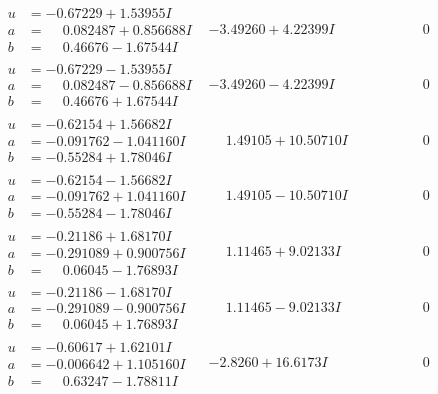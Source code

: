 \documentclass[1p]{elsarticle_modified}
\theoremstyle{definition}
\begin{document}
$$\begin{array}{c|c|c}
\begin{aligned}
u &= -0.67229 + 1.53955 I \\
a &= \phantom{-}0.082487 + 0.856688 I \\
b &= \phantom{-}0.46676 - 1.67544 I\end{aligned}
 & -3.49260 + 4.22399 I & \phantom{-0.000000 } 0 \\ \hline\begin{aligned}
u &= -0.67229 - 1.53955 I \\
a &= \phantom{-}0.082487 - 0.856688 I \\
b &= \phantom{-}0.46676 + 1.67544 I\end{aligned}
 & -3.49260 - 4.22399 I & \phantom{-0.000000 } 0 \\ \hline\begin{aligned}
u &= -0.62154 + 1.56682 I \\
a &= -0.091762 - 1.041160 I \\
b &= -0.55284 + 1.78046 I\end{aligned}
 & \phantom{-}1.49105 + 10.50710 I & \phantom{-0.000000 } 0 \\ \hline\begin{aligned}
u &= -0.62154 - 1.56682 I \\
a &= -0.091762 + 1.041160 I \\
b &= -0.55284 - 1.78046 I\end{aligned}
 & \phantom{-}1.49105 - 10.50710 I & \phantom{-0.000000 } 0 \\ \hline\begin{aligned}
u &= -0.21186 + 1.68170 I \\
a &= -0.291089 + 0.900756 I \\
b &= \phantom{-}0.06045 - 1.76893 I\end{aligned}
 & \phantom{-}1.11465 + 9.02133 I & \phantom{-0.000000 } 0 \\ \hline\begin{aligned}
u &= -0.21186 - 1.68170 I \\
a &= -0.291089 - 0.900756 I \\
b &= \phantom{-}0.06045 + 1.76893 I\end{aligned}
 & \phantom{-}1.11465 - 9.02133 I & \phantom{-0.000000 } 0 \\ \hline\begin{aligned}
u &= -0.60617 + 1.62101 I \\
a &= -0.006642 + 1.105160 I \\
b &= \phantom{-}0.63247 - 1.78811 I\end{aligned}
 & -2.8260 + 16.6173 I & \phantom{-0.000000 } 0 \\ \hline\begin{aligned}

\end{aligned}
\end{array}$$
\end{document}
